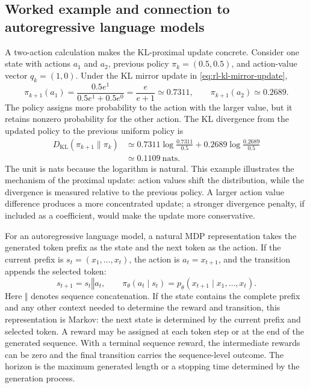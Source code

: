 \subsection{Worked example and connection to autoregressive language models}
\label{subsec:rl-worked-example-language-models}

A two-action calculation makes the KL-proximal update concrete. Consider one
state with actions $a_1$ and $a_2$, previous policy
$\pi_k=(0.5,0.5)$, and action-value vector $q_k=(1,0)$. Under the KL mirror
update in \cref{eq:rl-kl-mirror-update},
\begin{equation}
    \pi_{k+1}(a_1)
    =\frac{0.5e^1}{0.5e^1+0.5e^0}
    =\frac{e}{e+1}\simeq0.7311,
    \qquad
    \pi_{k+1}(a_2)\simeq0.2689.
    \label{eq:rl-numerical-mirror-update}
\end{equation}
The policy assigns more probability to the action with the larger value, but it
retains nonzero probability for the other action. The KL divergence from the
updated policy to the previous uniform policy is
\begin{equation}
    \begin{aligned}
    D_{\mathrm{KL}}(\pi_{k+1}\|\pi_k)
    &\simeq0.7311\log\frac{0.7311}{0.5}
      +0.2689\log\frac{0.2689}{0.5}\\
    &\simeq0.1109\ \text{nats}.
    \end{aligned}
    \label{eq:rl-numerical-kl}
\end{equation}
The unit is nats because the logarithm is natural. This example illustrates the
mechanism of the proximal update: action values shift the distribution, while
the divergence is measured relative to the previous policy. A larger action
value difference produces a more concentrated update; a stronger divergence
penalty, if included as a coefficient, would make the update more conservative.

For an autoregressive language model, a natural MDP representation takes the
generated token prefix as the state and the next token as the action. If the
current prefix is $s_t=(x_1,\ldots,x_t)$, the action is
$a_t=x_{t+1}$, and the transition appends the selected token:
\begin{equation}
    s_{t+1}=s_t\mathbin{\Vert}a_t,
    \qquad
    \pi_\theta(a_t\mid s_t)
    =p_\theta(x_{t+1}\mid x_1,\ldots,x_t).
    \label{eq:rl-language-model-mdp}
\end{equation}
Here $\mathbin{\Vert}$ denotes sequence concatenation. If the state contains
the complete prefix and any other context needed to determine the reward and
transition, this representation is Markov: the next state is determined by
the current prefix and selected token. A reward may be assigned at each token
step or at the end of the generated sequence. With a terminal sequence reward,
the intermediate rewards can be zero and the final transition carries the
sequence-level outcome. The horizon is the maximum generated length or a
stopping time determined by the generation process.

